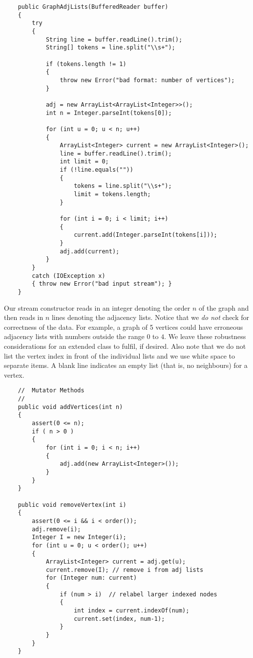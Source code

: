 {\renewcommand{\ttdefault}{pcr} %
\footnotesize \begin{verbatim}
    public GraphAdjLists(BufferedReader buffer)
    {
        try
        {
            String line = buffer.readLine().trim();
            String[] tokens = line.split("\\s+");

            if (tokens.length != 1)
            {
                throw new Error("bad format: number of vertices");
            }

            adj = new ArrayList<ArrayList<Integer>>();
            int n = Integer.parseInt(tokens[0]);

            for (int u = 0; u < n; u++)
            {
                ArrayList<Integer> current = new ArrayList<Integer>();
                line = buffer.readLine().trim();
                int limit = 0;
                if (!line.equals(""))
                {
                    tokens = line.split("\\s+");
                    limit = tokens.length;
                }

                for (int i = 0; i < limit; i++)
                {
                    current.add(Integer.parseInt(tokens[i]));
                }
                adj.add(current);
            }
        }
        catch (IOException x)
        { throw new Error("bad input stream"); }
    }
\end{verbatim}%
}

Our stream constructor reads in an integer denoting the order $n$ of the
graph and then reads in $n$ lines denoting the adjacency lists.  Notice
that we \emph{do not} check for correctness of the data.  For example,
a graph of 5 vertices could have erroneous adjacency lists with numbers
outside the range $0$ to $4$. We leave these robustness considerations
for an extended class to fulfil,  if desired.  Also note that we do not
list the vertex index in front of the individual lists and we use white
space to separate items. A blank line indicates an empty list (that is,
no neighbours) for a vertex.

{\renewcommand{\ttdefault}{pcr} %
\footnotesize \begin{verbatim}
    //  Mutator Methods
    //
    public void addVertices(int n)
    {
        assert(0 <= n);
        if ( n > 0 )
        {
            for (int i = 0; i < n; i++)
            {
                adj.add(new ArrayList<Integer>());
            }
        }
    }

    public void removeVertex(int i)
    {
        assert(0 <= i && i < order());
        adj.remove(i);
        Integer I = new Integer(i);
        for (int u = 0; u < order(); u++)
        {
            ArrayList<Integer> current = adj.get(u);
            current.remove(I); // remove i from adj lists
            for (Integer num: current)
            {
                if (num > i)  // relabel larger indexed nodes
                {
                    int index = current.indexOf(num);
                    current.set(index, num-1);
                }
            }
        }
    }
\end{verbatim}%
}

